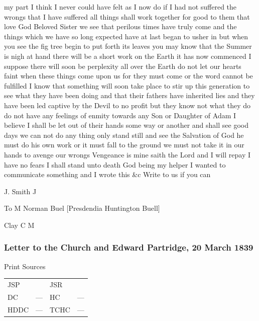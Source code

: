 					my part I think I never could have felt as I now do if I had not suffered the wrongs that I have suffered all things shall work together for good to them that love God Beloved Sister we see that perilous times have truly come and the things which we have so long expected have at last began to usher in but when you see the fig tree begin to put forth its leaves you may know that the Summer is nigh at hand there will be a short work on the Earth it has now commenced I suppose there will soon be perplexity all over the Earth do not let our hearts faint when these things come upon us for they must come or the word cannot be fulfilled I know that something will soon take place to stir up this generation to see what they have been doing and that their fathers have inherited lies and they have been led captive by the Devil to no profit but they know not what they do do not have any feelings of enmity towards any Son or Daughter of Adam I believe I shall be let out of their hands some way or another and shall see good days we can not do any thing only stand still and see the Salvation of God he must do his own work or it must fall to the ground we must not take it in our hands to avenge our wrongs Vengeance is mine saith the Lord and I will repay I have no fears I shall stand unto death God being my helper I wanted to communicate something and I wrote this \&c Write to us if you can

					\begin{tightright}
					J. Smith J
					\end{tightright}

					To M Norman Buel [Presdendia Huntington Buell]

					Clay C M
					
		\subsubsection{Letter to the Church and Edward Partridge, 20 March 1839}
			\label{EMS-1839-JS-20-MAR-1839}
			
			\begin{description}
					\item[Print Sources]
				\end{description}

					\begin{tabular}{p{0.5in}p{1in}p{0.5in}p{1in}}
					JSP	 	& 			& JSR 		&  \\
					DC	 	& ---		& HC 		& --- \\
					HDDC 	& ---		& TCHC 		& --- \\
					\end{tabular}
				
